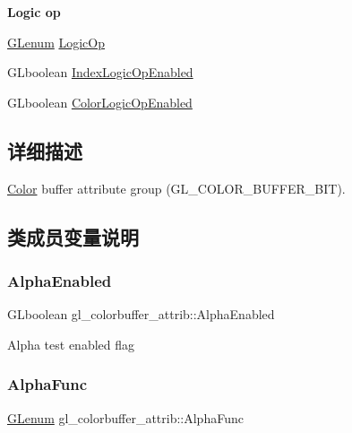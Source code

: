 \begin{Indent}\textbf{ Logic op}\par
\begin{DoxyCompactItemize}
\item 
\hyperlink{interfacevoid}{G\+Lenum} \hyperlink{structgl__colorbuffer__attrib_a7ebb2076111c79ae1bd365675082050f}{Logic\+Op}
\item 
G\+Lboolean \hyperlink{structgl__colorbuffer__attrib_a25a8a1bdf209cdb8983601b6aea87e0c}{Index\+Logic\+Op\+Enabled}
\item 
G\+Lboolean \hyperlink{structgl__colorbuffer__attrib_a1987ac616c0041140e6cb21e433b683a}{Color\+Logic\+Op\+Enabled}
\end{DoxyCompactItemize}
\end{Indent}


\subsection{详细描述}
\hyperlink{struct_color}{Color} buffer attribute group (G\+L\+\_\+\+C\+O\+L\+O\+R\+\_\+\+B\+U\+F\+F\+E\+R\+\_\+\+B\+IT). 

\subsection{类成员变量说明}
\mbox{\label{structgl__colorbuffer__attrib_a3912ae69e5b16c19eb7b3e5eb66afd08}} 
\subsubsection{\texorpdfstring{Alpha\+Enabled}{AlphaEnabled}}
{\footnotesize\ttfamily G\+Lboolean gl\+\_\+colorbuffer\+\_\+attrib\+::\+Alpha\+Enabled}

Alpha test enabled flag \mbox{\label{structgl__colorbuffer__attrib_a6781432179ca9ec93aab72bc95f780f1}} 
\subsubsection{\texorpdfstring{Alpha\+Func}{AlphaFunc}}
{\footnotesize\ttfamily \hyperlink{interfacevoid}{G\+Lenum} gl\+\_\+colorbuffer\+\_\+attrib\+::\+Alpha\+Func}

